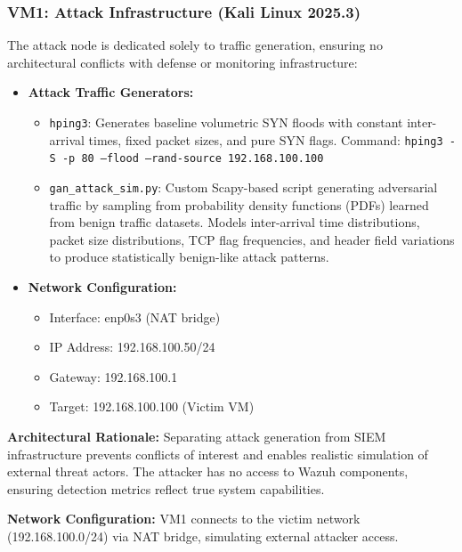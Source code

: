 \subsubsection{VM1: Attack Infrastructure (Kali Linux 2025.3)}

The attack node is dedicated solely to traffic generation, ensuring no architectural conflicts with defense or monitoring infrastructure:

\begin{itemize}
    \item \textbf{Attack Traffic Generators:}
    \begin{itemize}
        \item \texttt{hping3}: Generates baseline volumetric SYN floods with constant inter-arrival times, fixed packet sizes, and pure SYN flags. Command: \texttt{hping3 -S -p 80 --flood --rand-source 192.168.100.100}
        
        \item \texttt{gan\_attack\_sim.py}: Custom Scapy-based script generating adversarial traffic by sampling from probability density functions (PDFs) learned from benign traffic datasets. Models inter-arrival time distributions, packet size distributions, TCP flag frequencies, and header field variations to produce statistically benign-like attack patterns.
    \end{itemize}
    
    \item \textbf{Network Configuration:}
    \begin{itemize}
        \item Interface: enp0s3 (NAT bridge)
        \item IP Address: 192.168.100.50/24
        \item Gateway: 192.168.100.1
        \item Target: 192.168.100.100 (Victim VM)
    \end{itemize}
\end{itemize}

\textbf{Architectural Rationale:} Separating attack generation from SIEM infrastructure prevents conflicts of interest and enables realistic simulation of external threat actors. The attacker has no access to Wazuh components, ensuring detection metrics reflect true system capabilities.

\textbf{Network Configuration:} VM1 connects to the victim network (192.168.100.0/24) via NAT bridge, simulating external attacker access.

